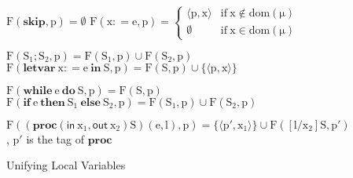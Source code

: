 \documentclass{llncs}
\begin{document}
\begin{figure}[b]
\begin{minipage}[t]{4.8in}\footnotesize
$\mathrm{F(\textbf{skip}, p)=\emptyset}$\qquad
$\mathrm{F(x\mathrel{\mathop:}= e, p) =} \left\{
\begin{array}{ll} \mathrm{\langle p,x\rangle} &
\mathrm{if\ x\notin dom(\mu)}\\
\mathrm{\emptyset} & \mathrm{if\ x\in dom(\mu)}\end{array} \right.$

$\mathrm{F(S_1;S_2, p)=F(S_1, p)\cup F(S_2, p)}$\hspace*{\fill}
$\mathrm{F(\textbf{letvar}\ x\mathrel{\mathop:}= e\ \textbf{in}\ S,
p)=F(S, p)\cup\{\langle p,x\rangle \}}$

$\mathrm{F(\textbf{while}\ e\ \textbf{do}\ S,
p)=F(S,p)}$\hspace*{\fill} $\mathrm{F(\textbf{if}\ e\ \textbf{then}\
S_1\ \textbf{else}\ S_2, p)=F(S_1, p)\cup F(S_2,p)}$

$\mathrm{F((\textbf{proc}(\textsf{in}\ x_1,\textsf{out}\
x_2)S)(e,l), p)=\{\langle p',x_1\rangle \}\cup F([l/x_2]S,
p')}$,\hspace*{\fill} $\mathrm{p'}$ is the tag of
$\mathrm{\textbf{proc}}$
\end{minipage}
\caption{\label{fig:unification}Unifying Local Variables}
\end{figure}
\end{document}
